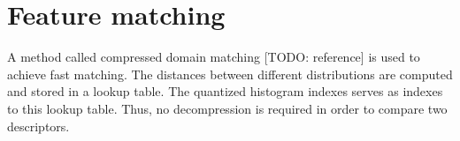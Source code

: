 \section{Feature matching}

A method called compressed domain matching [TODO: reference] is used to achieve fast matching. The distances between different distributions are computed and stored in a lookup table. The quantized histogram indexes serves as indexes to this lookup table. Thus, no decompression is required in order to compare two descriptors.
